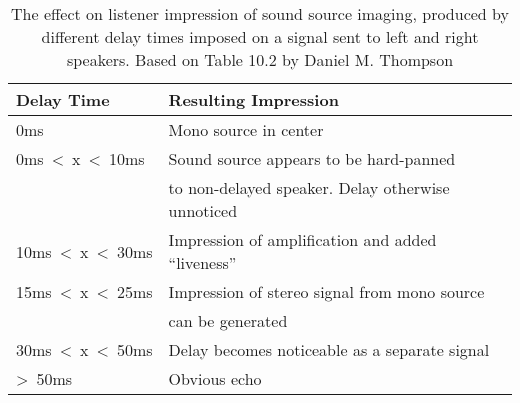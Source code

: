 \begin{table}[H]
	\begin{tabular}[c]{l | l}
		Delay Time			& Resulting Impression \\ \hline
		0ms				& Mono source in center \\
		0ms~\textless~x~\textless~10ms	& Sound source appears to be hard-panned \\ & to non-delayed speaker. Delay otherwise unnoticed \\
		10ms~\textless~x~\textless~30ms	& Impression of amplification and added ``liveness'' \\
		15ms~\textless~x~\textless~25ms	& Impression of stereo signal from mono source \\ & can be generated \\
		30ms~\textless~x~\textless~50ms	& Delay becomes noticeable as a separate signal \\
		\textgreater~50ms		& Obvious echo \\
	\end{tabular}
	\label{tab:delaytimes}
	\caption{The effect on listener impression of sound source imaging, produced by different delay times imposed on a signal sent to left and right speakers. Based on Table 10.2 by Daniel M. Thompson \cite{UnderstandingAudio}}
\end{table}
